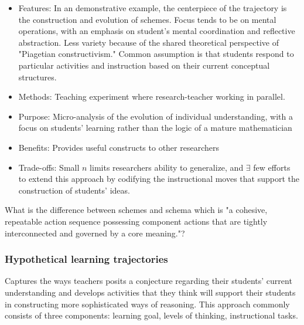 \documentclass{TC}
\begin{document}
\begin{multicols}{2}
\begin{itemize}
\item Features: In an demonstrative example, the centerpiece of the trajectory is the construction and evolution of schemes. Focus tends to be on mental operations, with an emphasis on student's mental coordination and reflective abstraction. Less variety because of the shared theoretical perspective of "Piagetian constructivism." Common assumption is that students respond to particular activities and instruction based on their current conceptual structures.
\item Methods: Teaching experiment where research-teacher working in parallel.
\item Purpose: Micro-analysis of the evolution of individual understanding, with a focus on students' learning rather than the logic of a mature mathematician
\item Benefits: Provides useful constructs to other researchers
\item Trade-offs: Small $n$ limits researchers ability to generalize, and $\exists$ few efforts to extend this approach by codifying the instructional moves that support the construction of students' ideas.
 \end{itemize}
 \end{multicols} 
  
\begin{remark}
What is the difference between schemes and schema which is "a cohesive, repeatable action sequence possessing component actions that are tightly interconnected and governed by a core meaning."?
\end{remark}
\subsubsection{Hypothetical learning trajectories} 

 Captures the ways teachers posits a conjecture regarding their students' current understanding and develops activities that they think will support their students in constructing more sophisticated ways of reasoning. This approach commonly consists of three components: learning goal, levels of thinking, instructional tasks.
 
\end{document}
